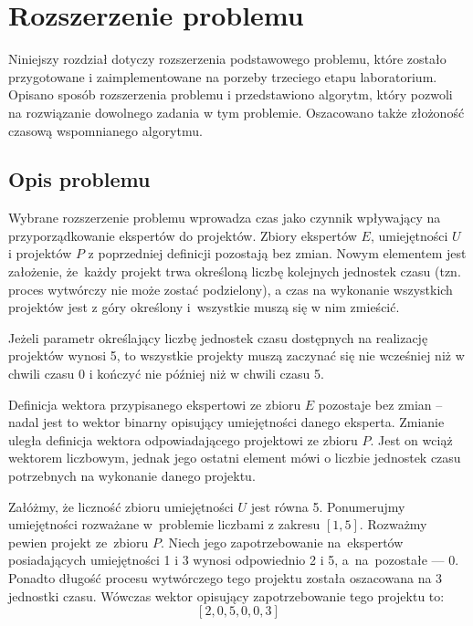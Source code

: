\documentclass[12pt,a4paper]{article}
\theoremstyle{definition}
\begin{document}
\newpage
\section{Rozszerzenie problemu}
Niniejszy rozdział dotyczy rozszerzenia podstawowego problemu, które zostało przygotowane i zaimplementowane na porzeby trzeciego etapu laboratorium. Opisano sposób rozszerzenia problemu i przedstawiono algorytm, który pozwoli na rozwiązanie dowolnego zadania w tym problemie. Oszacowano także złożoność czasową wspomnianego algorytmu.

\subsection{Opis problemu}
Wybrane rozszerzenie problemu wprowadza czas jako czynnik wpływający na przyporządkowanie ekspertów do projektów. Zbiory ekspertów $E$, umiejętności $U$ i projektów $P$ z poprzedniej definicji pozostają bez zmian. Nowym elementem jest założenie, że~każdy projekt trwa określoną liczbę kolejnych jednostek czasu (tzn. proces wytwórczy nie może zostać podzielony), a czas na wykonanie wszystkich projektów jest z góry określony i~wszystkie muszą się w nim zmieścić.\\

\begin{tcolorbox}[title=Przykład --- czas na wykonanie projektów]
Jeżeli parametr określający liczbę jednostek czasu dostępnych na realizację projektów wynosi 5, to wszystkie projekty muszą zaczynać się nie wcześniej niż w chwili czasu 0 i kończyć nie później niż w chwili czasu 5.
\end{tcolorbox}

\vspace{0.5em}
\noindent
Definicja wektora przypisanego ekspertowi ze zbioru $E$ pozostaje bez zmian -- nadal jest to wektor binarny opisujący umiejętności danego eksperta. Zmianie uległa definicja wektora odpowiadającego projektowi ze zbioru $P$. Jest on wciąż wektorem liczbowym, jednak jego ostatni element mówi o liczbie jednostek czasu potrzebnych na wykonanie danego projektu.\\

\begin{tcolorbox}[title=Przykład --- wektor projektu]
Załóżmy, że liczność zbioru umiejętności $U$ jest równa 5. Ponumerujmy umiejętności rozważane w~problemie liczbami z zakresu $[1, 5]$. Rozważmy pewien projekt ze~zbioru $P$. Niech jego zapotrzebowanie na~ekspertów posiadających umiejętności 1 i 3 wynosi odpowiednio 2 i 5, a~na~pozostałe --- 0. Ponadto długość procesu wytwórczego tego projektu została oszacowana na 3 jednostki czasu. Wówczas wektor opisujący zapotrzebowanie tego projektu to:
$$[2, 0, 5, 0, 0, 3]$$
\end{tcolorbox}
\end{document}
